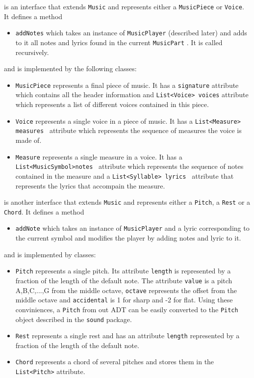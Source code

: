 \documentclass[12pt]{book}
\begin{document}
 is an interface that extends {\tt Music} and represents either a {\tt MusicPiece} or {\tt Voice}.  It defines a method
\begin{itemize} 
\item { \tt addNotes} which takes an instance of  {\tt MusicPlayer} (described later) and adds to it all notes and lyrics found in the current {\tt MusicPart}  . It is called recursively.
\end{itemize}

\noindent and is implemented by the following classes:
\begin{itemize} 
\item { \tt MusicPiece} represents a final piece of music.   It has a {\tt signature} attribute which contains all the header information and {\tt List<Voice> voices} attribute which represents a list of different voices contained in this piece.
\item {\tt Voice}  represents a single voice in a piece of music. It has a {\tt List<Measure> measures } attribute which represents the sequence of measures the voice is made of.
\item {\tt Measure}  represents a single measure in a voice. It has a {\tt List<MusicSymbol>notes } attribute which represents the sequence of notes contained in the measure and a  {\tt List<Syllable> lyrics } attribute that represents the lyrics that accompain the measure.
\end{itemize}

\bigskip

 is another interface that extends {\tt Music} and represents either a {\tt Pitch}, a {\tt Rest} or a {\tt Chord}. It defines a method
\begin{itemize} 
\item { \tt addNote} which takes an instance of  {\tt MusicPlayer} and a lyric corresponding to the current symbol and modifies the player by adding notes and lyric to it. 
\end{itemize}
\noindent and is implemented by classes:
\begin{itemize} 
\item { \tt Pitch} represents a single pitch. Its attribute {\tt length} is represented by a fraction  of the length of the default note. The attribute {\tt value} is a pitch A,B,C,...,G from the middle octave,  {\tt octave} represents the offset from the middle octave and  {\tt accidental} is 1 for sharp and -2 for flat. Using these conviniences,  a {\tt Pitch} from out ADT can be easily converted to the {\tt Pitch} object described in the {\tt sound} package.
\item { \tt Rest} represents a single rest and has an attribute {\tt length}  represented by a fraction of the length of the default note. 
\item {\tt Chord} represents a chord of several pitches and stores them in the {\tt List<Pitch>} attribute.
\end{itemize}
\end{document}
